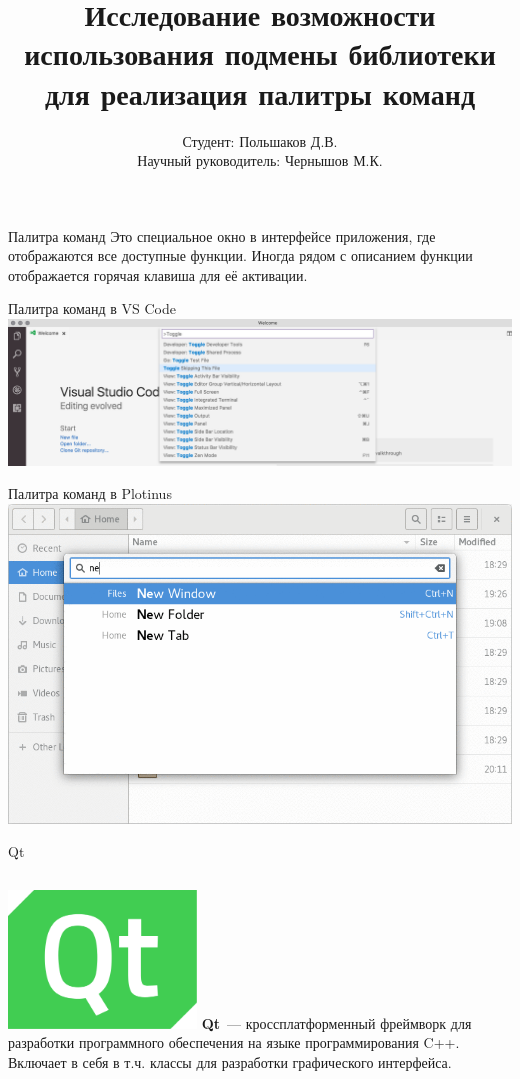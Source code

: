 \documentclass[aspectratio=1610]{beamer}
\title[Thesis]{Исследование возможности использования подмены библиотеки для реализация палитры команд}
\author{Студент: Польшаков Д.В. \\ Научный руководитель: Чернышов М.К.}
\institute{ВГУ}
\date{\the\year}
\begin{document}
	
\frame{\titlepage}

\begin{frame}{Палитра команд}
	Это специальное окно в интерфейсе приложения, где отображаются все доступные
	функции. Иногда рядом с описанием функции отображается горячая клавиша для
	её активации.
\end{frame}

\begin{frame}{Палитра команд в VS Code}
	\centering
	\includegraphics[width=\textwidth]{vscode}
\end{frame}

\begin{frame}{Палитра команд в Plotinus}
	\centering
	\includegraphics[height=0.9\textheight]{Plotinus}
\end{frame}

\begin{frame}{Qt}
    \begin{columns}
		\centering
		\includegraphics[width=5cm]{Qt}
		\textbf{Qt}~— кроссплатформенный фреймворк для разработки программного обеспечения на языке программирования C++. Включает в себя в т.ч. классы для разработки
		графического интерфейса.
	\end{columns}	
\end{frame}
\end{document}
